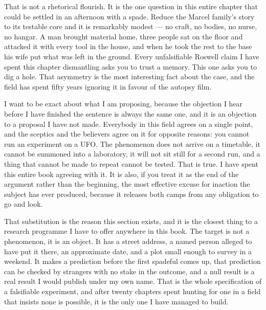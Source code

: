 That is not a rhetorical flourish. It is the one question in this entire chapter that could be settled
in an afternoon with a spade. Reduce the Marcel family's story to its testable core and it is
remarkably modest --- no craft, no bodies, no nurse, no hangar. A man brought material home, three
people sat on the floor and attacked it with every tool in the house, and when he took the rest to the
base his wife put what was left in the ground. Every unfalsifiable Roswell claim I have spent this
chapter dismantling asks you to trust a memory. This one asks you to dig a hole. That asymmetry is the
most interesting fact about the case, and the field has spent fifty years ignoring it in favour of the
autopsy film.

I want to be exact about what I am proposing, because the objection I hear before I have finished the
sentence is always the same one, and it is an objection to a proposal I have not made. Everybody in
this field agrees on a single point, and the sceptics and the believers agree on it for opposite
reasons: you cannot run an experiment on a UFO. The phenomenon does not arrive on a timetable, it
cannot be summoned into a laboratory, it will not sit still for a second run, and a thing that cannot
be made to repeat cannot be tested. That is true. I have spent this entire book agreeing with it. It
is also, if you treat it as the end of the argument rather than the beginning, the most effective
excuse for inaction the subject has ever produced, because it releases both camps from any obligation
to go and look.


That substitution is the reason this section exists, and it is the closest thing to a research
programme I have to offer anywhere in this book.  The target is not a phenomenon, it is an object. It has
a street address, a named person alleged to have put it there, an approximate date, and a plot small
enough to survey in a weekend. It makes a prediction before the first spadeful comes up, that
prediction can be checked by strangers with no stake in the outcome, and a null result is a real
result I would publish under my own name. That is the whole specification of a falsifiable experiment,
and after twenty chapters spent hunting for one in a field that insists none is possible, it is the
only one I have managed to build.

